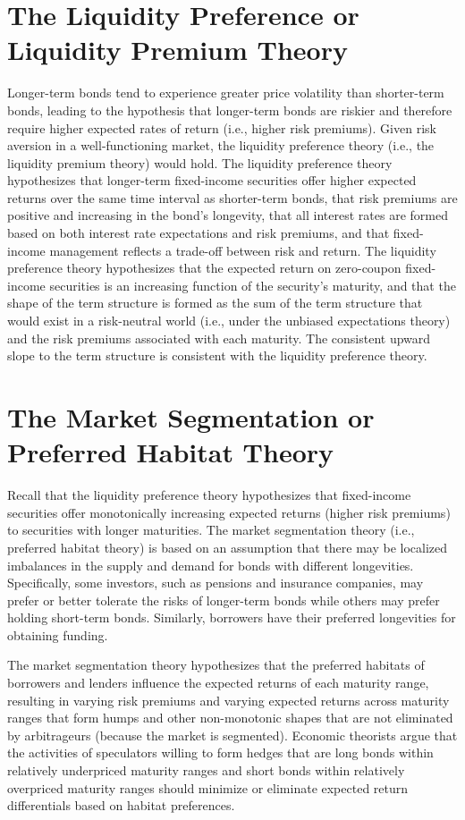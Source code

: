\documentclass[11pt]{article}
\begin{document}
\section*{The Liquidity Preference or Liquidity Premium Theory}
Longer-term bonds tend to experience greater price volatility than shorter-term bonds, leading to the hypothesis that longer-term bonds are riskier and therefore require higher expected rates of return (i.e., higher risk premiums). Given risk aversion in a well-functioning market, the liquidity preference theory (i.e., the liquidity premium theory) would hold. The liquidity preference theory hypothesizes that longer-term fixed-income securities offer higher expected returns over the same time interval as shorter-term bonds, that risk premiums are positive and increasing in the bond's longevity, that all interest rates are formed based on both interest rate expectations and risk premiums, and that fixed-income management reflects a trade-off between risk and return. The liquidity preference theory hypothesizes that the expected return on zero-coupon fixed-income securities is an increasing function of the security's maturity, and that the shape of the term structure is formed as the sum of the term structure that would exist in a risk-neutral world (i.e., under the unbiased expectations theory) and the risk premiums associated with each maturity. The consistent upward slope to the term structure is consistent with the liquidity preference theory.

\section*{The Market Segmentation or Preferred Habitat Theory}
Recall that the liquidity preference theory hypothesizes that fixed-income securities offer monotonically increasing expected returns (higher risk premiums) to securities with longer maturities. The market segmentation theory (i.e., preferred habitat theory) is based on an assumption that there may be localized imbalances in the supply and demand for bonds with different longevities. Specifically, some investors, such as pensions and insurance companies, may prefer or better tolerate the risks of longer-term bonds while others may prefer holding short-term bonds. Similarly, borrowers have their preferred longevities for obtaining funding.

The market segmentation theory hypothesizes that the preferred habitats of borrowers and lenders influence the expected returns of each maturity range, resulting in varying risk premiums and varying expected returns across maturity ranges that form humps and other non-monotonic shapes that are not eliminated by arbitrageurs (because the market is segmented). Economic theorists argue that the activities of speculators willing to form hedges that are long bonds within relatively underpriced maturity ranges and short bonds within relatively overpriced maturity ranges should minimize or eliminate expected return differentials based on habitat preferences.
\end{document}
